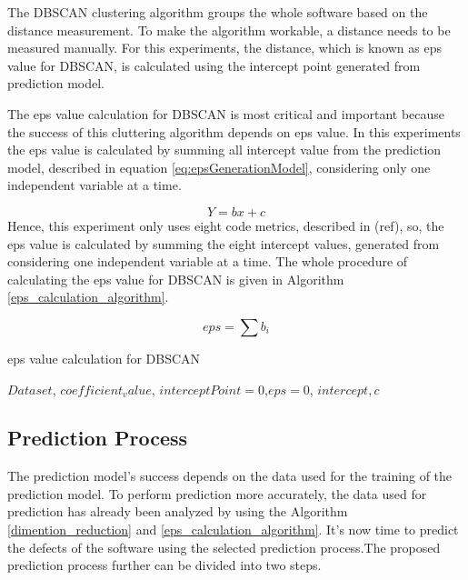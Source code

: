 \documentclass[12pt]{report}
\begin{document}
The DBSCAN clustering algorithm groups the whole software based on the distance measurement. To make the algorithm workable, a distance needs to be measured manually. For this experiments, the distance, which is known as eps value for DBSCAN, is calculated using the intercept point generated from prediction model.

The eps value calculation for DBSCAN is most critical and important because the success of this cluttering algorithm depends on eps value. In this experiments the eps value is calculated by summing all intercept value from the prediction model, described in equation \ref{eq:epsGenerationModel}, considering only one independent variable at a time. 

\begin{equation}
\label{eq:epsGenerationModel}
 Y=bx+c
\end{equation}
Hence, this experiment only uses eight code metrics, described in (ref{}), so, the eps value is calculated by summing the eight intercept values, generated from considering one independent variable at a time.  
The whole procedure of calculating the eps value for DBSCAN is given in Algorithm \ref{eps_calculation_algorithm}. 

\begin{equation}
\label{eq:totalepsCalculation}
 eps=\sum{b_{i}}
\end{equation}

\begin{algorithm}
	\caption{eps value calculation for DBSCAN}
	\label{eps_calculation_algorithm}
		\begin{algorithmic}[1]
			\REQUIRE  $ Dataset$, $coefficient_value$, $interceptPoint=0$,$eps=0$, $intercept, c$
				
				\ENDFOR
		\end{algorithmic}
	\end{algorithm}
	
	
	
\subsection{Prediction Process}
The prediction model's success depends on the data used for the training of the prediction model. To perform prediction more accurately, the data used for prediction has already been analyzed by using the Algorithm \ref{dimention_reduction} and \ref{eps_calculation_algorithm}. It's now time to predict the defects of the software using the selected prediction process.The proposed prediction process further can be divided into two steps.
\end{document}
